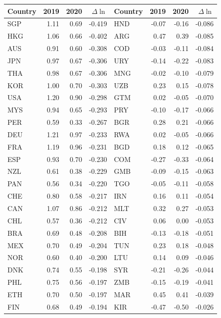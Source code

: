 \begin{tabular}{lrrr@{\hskip 2em}lrrr}
\toprule
Country & 2019 & 2020 & $\Delta\ln$ & Country & 2019 & 2020 & $\Delta\ln$ \\
\midrule
SGP & 1.11 & 0.69 & -0.419 & HND & -0.07 & -0.16 & -0.086 \\
HKG & 1.06 & 0.66 & -0.402 & ARG & 0.47 & 0.39 & -0.085 \\
AUS & 0.91 & 0.60 & -0.308 & COD & -0.03 & -0.11 & -0.084 \\
JPN & 0.97 & 0.67 & -0.306 & URY & -0.14 & -0.22 & -0.083 \\
THA & 0.98 & 0.67 & -0.306 & MNG & -0.02 & -0.10 & -0.079 \\
KOR & 1.00 & 0.70 & -0.303 & UZB & 0.23 & 0.15 & -0.078 \\
USA & 1.20 & 0.90 & -0.298 & GTM & 0.02 & -0.05 & -0.070 \\
MYS & 0.94 & 0.65 & -0.293 & PRY & -0.10 & -0.17 & -0.066 \\
PER & 0.59 & 0.33 & -0.267 & BGR & 0.28 & 0.21 & -0.066 \\
DEU & 1.21 & 0.97 & -0.233 & RWA & 0.02 & -0.05 & -0.066 \\
FRA & 1.19 & 0.96 & -0.231 & BGD & 0.18 & 0.12 & -0.065 \\
ESP & 0.93 & 0.70 & -0.230 & COM & -0.27 & -0.33 & -0.064 \\
NZL & 0.61 & 0.38 & -0.229 & GMB & -0.09 & -0.15 & -0.063 \\
PAN & 0.56 & 0.34 & -0.220 & TGO & -0.05 & -0.11 & -0.058 \\
CHE & 0.80 & 0.58 & -0.217 & IRN & 0.16 & 0.11 & -0.054 \\
CAN & 1.07 & 0.86 & -0.212 & MLT & 0.32 & 0.27 & -0.053 \\
CHL & 0.57 & 0.36 & -0.212 & CIV & 0.06 & 0.00 & -0.053 \\
BRA & 0.69 & 0.48 & -0.208 & BIH & -0.13 & -0.18 & -0.051 \\
MEX & 0.70 & 0.49 & -0.204 & TUN & 0.23 & 0.18 & -0.048 \\
NOR & 0.60 & 0.40 & -0.200 & LTU & 0.14 & 0.09 & -0.046 \\
DNK & 0.74 & 0.55 & -0.198 & SYR & -0.21 & -0.26 & -0.044 \\
PHL & 0.75 & 0.56 & -0.197 & ZMB & -0.15 & -0.19 & -0.041 \\
ETH & 0.70 & 0.50 & -0.197 & MAR & 0.45 & 0.41 & -0.039 \\
FIN & 0.68 & 0.49 & -0.194 & KIR & -0.47 & -0.50 & -0.026 \\

\end{tabular}
